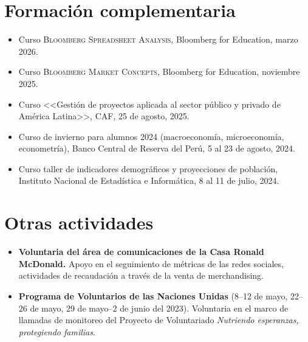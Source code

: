\documentclass[10pt,a4paper]{article}
\begin{document}
\section{Formaci\'on complementaria}
\begin{itemize}
  \item Curso \textsc{Bloomberg Spreadsheet Analysis}, Bloomberg for Education, marzo 2026.
  \item Curso \textsc{Bloomberg Market Concepts}, Bloomberg for Education, noviembre 2025.
  \item Curso <<Gesti\'on de proyectos aplicada al sector p\'ublico y privado de Am\'erica Latina>>, CAF, 25 de agosto, 2025.
  \item Curso de invierno para alumnos 2024 (macroeconom\'ia, microeconom\'ia, econometr\'ia), Banco Central de Reserva del Per\'u, 5 al 23 de agosto, 2024.
  \item Curso taller de indicadores demogr\'aficos y proyecciones de poblaci\'on, Instituto Nacional de Estad\'istica e Inform\'atica, 8 al 11 de julio, 2024.
\end{itemize}

\section{Otras actividades}
\begin{itemize}
  \item {\bfseries Voluntaria del \'area de comunicaciones de la Casa Ronald McDonald.} Apoyo en el seguimiento de m\'etricas de las redes sociales, actividades de recaudaci\'on a trav\'es de la venta de merchandising.
  \item {\bfseries Programa de Voluntarios de las Naciones Unidas} (8--12 de mayo, 22--26 de mayo, 29 de mayo--2 de junio del 2023). Voluntaria en el marco de llamadas de monitoreo del Proyecto de Voluntariado \emph{Nutriendo esperanzas, protegiendo familias}.
\end{itemize}
\end{document}
